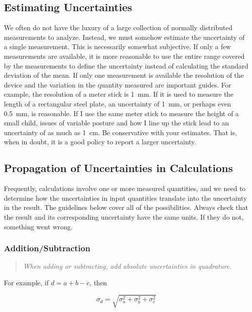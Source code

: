 \documentclass[12pt]{article}
\begin{document}
\subsection*{Estimating Uncertainties}

We often do not have the luxury of a large collection of normally
distributed measurements to analyze. Instead, we must somehow estimate
the uncertainty of a single measurement. This is necessarily somewhat
subjective. If only a few measurements are available, it is more
reasonable to use the entire range covered by the measurements to
define the uncertainty instead of calculating the standard deviation
of the mean. If only one measurement is available the resolution of
the device and the variation in the quantity measured are important
guides. For example, the resolution of a meter stick is 1~mm. If it is
used to measure the length of a rectangular steel plate, an
uncertainty of 1~mm, or perhaps even 0.5~mm, is reasonable. If I use
the same meter stick to measure the height of a small child, issues
of variable posture and how I line up the stick lead to an uncertainty
of as much as 1~cm. Be conservative with your estimates. That is, when
in doubt, it is a good policy to report a larger uncertainty.

\subsection*{Propagation of Uncertainties in Calculations}

Frequently, calculations involve one or more measured quantities, and we
need to determine how the uncertainties in input quantities translate
into the uncertainty in the result. The guidelines below cover all
of the possibilities. Always check that the result and its
corresponding uncertainty have the same units. If they do not,
something went wrong.

\subsubsection*{Addition/Subtraction}

\begin{quote}
\textit{When adding or subtracting, add absolute uncertainties in
quadrature.}
\end{quote}

For example, if $d = a+b-c$, then 

\begin{equation}
\sigma_d = \sqrt{\sigma_a^2+\sigma_b^2+\sigma_c^2}
\end{equation}
\end{document}

